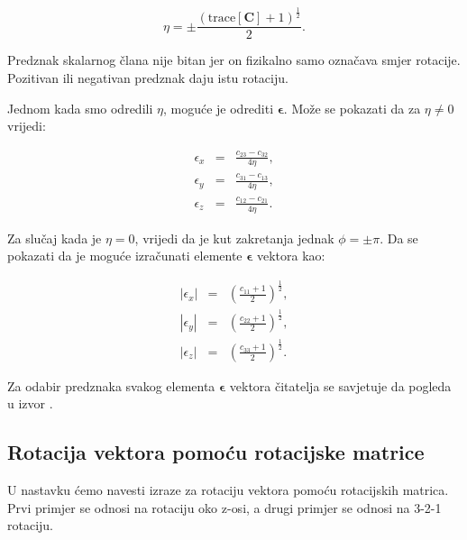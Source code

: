 \documentclass[times, utf8, diplomski, numeric]{templates/template}
\begin{document}
{{{{                \begin{equation}
                    \eta = \pm\frac{(\text{trace}[\textbf{C}] + 1)^{\frac{1}{2}}}{2}.
                \end{equation}

                Predznak skalarnog člana nije bitan jer on fizikalno samo označava smjer rotacije. Pozitivan ili negativan predznak daju istu rotaciju.

                Jednom kada smo odredili $\eta$, moguće je odrediti $\boldsymbol\epsilon$. Može se pokazati da za $\eta \neq 0$ vrijedi:

                \begin{equation}
                \begin{array}{rcl}
                    \epsilon_{x} & = & \frac{c_{23} - c_{32}}{4\eta}, \\
                    \epsilon_{y} & = & \frac{c_{31} - c_{13}}{4\eta}, \\
                    \epsilon_{z} & = & \frac{c_{12} - c_{21}}{4\eta}.
                \end{array}
                \end{equation}

                Za slučaj kada je $\eta=0$, vrijedi da je kut zakretanja jednak $\phi=\pm\pi$. Da se pokazati da je moguće izračunati elemente $\boldsymbol\epsilon$ vektora kao:

                \begin{equation}
                \begin{array}{rcl}
                    |\epsilon_{x}| & = & (\frac{c_{11} + 1}{2})^{\frac{1}{2}}, \\
                    |\epsilon_{y}| & = & (\frac{c_{22} + 1}{2})^{\frac{1}{2}}, \\
                    |\epsilon_{z}| & = & (\frac{c_{33} + 1}{2})^{\frac{1}{2}}.
                \end{array}
                \end{equation}

                Za odabir predznaka svakog elementa $\boldsymbol\epsilon$ vektora čitatelja se savjetuje da pogleda u izvor \cite{adcsKnjiga}.
            }
        }

        \subsection{Rotacija vektora pomoću rotacijske matrice}{
            U nastavku ćemo navesti izraze za rotaciju vektora pomoću rotacijskih matrica. Prvi primjer se odnosi na rotaciju oko z-osi, a drugi primjer se odnosi na 3-2-1 rotaciju. 

}}}
\end{document}
